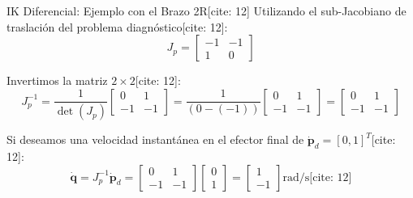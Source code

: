 \documentclass[aspectratio=169, xcolor={table,xcdraw}]{beamer}
\begin{document}
\begin{frame}{IK Diferencial: Ejemplo con el Brazo 2R[cite: 12]}
    Utilizando el sub-Jacobiano de traslación del problema diagnóstico[cite: 12]:
    \begin{equation*}
        J_p = \begin{bmatrix} -1 & -1 \\ 1 & 0 \end{bmatrix}
    \end{equation*}
    
    Invertimos la matriz $2 \times 2$[cite: 12]:
    \begin{equation*}
        J_p^{-1} = \frac{1}{\det(J_p)} \begin{bmatrix} 0 & 1 \\ -1 & -1 \end{bmatrix} = \frac{1}{(0 - (-1))} \begin{bmatrix} 0 & 1 \\ -1 & -1 \end{bmatrix} = \begin{bmatrix} 0 & 1 \\ -1 & -1 \end{bmatrix}
    \end{equation*}
    
    Si deseamos una velocidad instantánea en el efector final de $\dot{\mathbf{p}}_d = [0, 1]^T$[cite: 12]:
    \begin{equation*}
        \boxed{ \dot{\mathbf{q}} = J_p^{-1} \dot{\mathbf{p}}_d = \begin{bmatrix} 0 & 1 \\ -1 & -1 \end{bmatrix} \begin{bmatrix} 0 \\ 1 \end{bmatrix} = \begin{bmatrix} 1 \\ -1 \end{bmatrix} \mathrm{rad/s} } \text{[cite: 12]}
    \end{equation*}
\end{frame}
\end{document}
